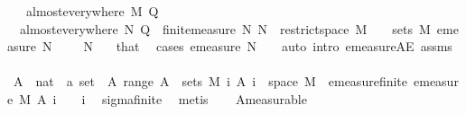 \begin{isabellebody}
\ \ \ {\isachardoublequoteopen}almost{\isacharunderscore}{\kern0pt}everywhere\ M\ Q{\isachardoublequoteclose}\isanewline
%
\isadelimproof
%
\endisadelimproof
%
\isatagproof
{}\isamarkupfalse%
\ {\isacharminus}{\kern0pt}\isanewline
\ \ \isamarkupfalse%
\ {\isacharasterisk}{\kern0pt}{\isacharcolon}{\kern0pt}\ {\isachardoublequoteopen}almost{\isacharunderscore}{\kern0pt}everywhere\ N\ Q{\isachardoublequoteclose}\ \ {\isachardoublequoteopen}finite{\isacharunderscore}{\kern0pt}measure\ N{\isachardoublequoteclose}\ {\isachardoublequoteopen}N\ {\isacharequal}{\kern0pt}\ restrict{\isacharunderscore}{\kern0pt}space\ M\ {\isasymOmega}{\isachardoublequoteclose}\ {\isachardoublequoteopen}{\isasymOmega}\ {\isasymin}\ sets\ M{\isachardoublequoteclose}\ {\isachardoublequoteopen}emeasure\ N\ {\isasymOmega}\ {\isasymnoteq}\ {\isasyminfinity}{\isachardoublequoteclose}\ \ N\ {\isasymOmega}\ \isamarkupfalse%
\ that\ \isamarkupfalse%
\ {\isacharparenleft}{\kern0pt}cases\ {\isachardoublequoteopen}emeasure\ N\ {\isasymOmega}\ {\isacharequal}{\kern0pt}\ {}{\isachardoublequoteclose}{\isacharcomma}{\kern0pt}\ auto\ intro{\isacharcolon}{\kern0pt}\ emeasure{\isacharunderscore}{\kern0pt}{}{\isacharunderscore}{\kern0pt}AE\ assms{\isacharparenleft}{\kern0pt}{}{\isacharparenright}{\kern0pt}{\isacharparenright}{\kern0pt}\isanewline
\isanewline
\ \ \isamarkupfalse%
\ A\ {\isacharcolon}{\kern0pt}{\isacharcolon}{\kern0pt}\ {\isachardoublequoteopen}nat\ {\isasymRightarrow}\ {\isacharprime}{\kern0pt}a\ set{\isachardoublequoteclose}\ \ A{\isacharcolon}{\kern0pt}\ {\isachardoublequoteopen}range\ A\ {\isasymsubseteq}\ sets\ M{\isachardoublequoteclose}\ {\isachardoublequoteopen}{\isacharparenleft}{\kern0pt}{\isasymUnion}i{\isachardot}{\kern0pt}\ A\ i{\isacharparenright}{\kern0pt}\ {\isacharequal}{\kern0pt}\ space\ M{\isachardoublequoteclose}\ \ emeasure{\isacharunderscore}{\kern0pt}finite{\isacharcolon}{\kern0pt}\ {\isachardoublequoteopen}emeasure\ M\ {\isacharparenleft}{\kern0pt}A\ i{\isacharparenright}{\kern0pt}\ {\isasymnoteq}\ {\isasyminfinity}{\isachardoublequoteclose}\ \ i\ \isamarkupfalse%
\ sigma{\isacharunderscore}{\kern0pt}finite\ \isamarkupfalse%
\ metis\isanewline
\ \ \isamarkupfalse%
\ A{\isacharparenleft}{\kern0pt}{}{\isacharparenright}{\kern0pt}{\isacharbrackleft}{\kern0pt}measurable{\isacharbrackright}{\kern0pt}\isanewline

\end{isabellebody}
